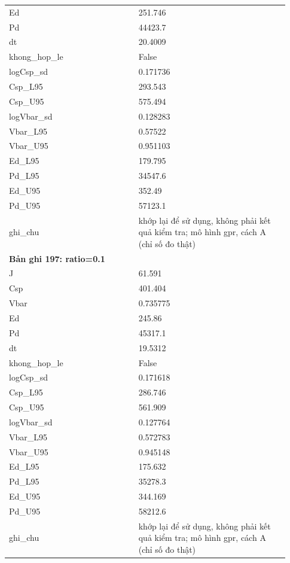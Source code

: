 \begin{longtable}{p{0.43\linewidth}p{0.50\linewidth}}
Ed & 251.746 \\
Pd & 44423.7 \\
dt & 20.4009 \\
khong\_\allowbreak hop\_\allowbreak le & False \\
logCsp\_\allowbreak sd & 0.171736 \\
Csp\_\allowbreak L95 & 293.543 \\
Csp\_\allowbreak U95 & 575.494 \\
logVbar\_\allowbreak sd & 0.128283 \\
Vbar\_\allowbreak L95 & 0.57522 \\
Vbar\_\allowbreak U95 & 0.951103 \\
Ed\_\allowbreak L95 & 179.795 \\
Pd\_\allowbreak L95 & 34547.6 \\
Ed\_\allowbreak U95 & 352.49 \\
Pd\_\allowbreak U95 & 57123.1 \\
ghi\_\allowbreak chu & khớp lại để sử dụng, không phải kết quả kiểm tra; mô hình gpr, cách A (chỉ số đo thật) \\
\midrule
\multicolumn{2}{p{0.95\linewidth}}{\textbf{Bản ghi 197: ratio=0.1}} \\
J & 61.591 \\
Csp & 401.404 \\
Vbar & 0.735775 \\
Ed & 245.86 \\
Pd & 45317.1 \\
dt & 19.5312 \\
khong\_\allowbreak hop\_\allowbreak le & False \\
logCsp\_\allowbreak sd & 0.171618 \\
Csp\_\allowbreak L95 & 286.746 \\
Csp\_\allowbreak U95 & 561.909 \\
logVbar\_\allowbreak sd & 0.127764 \\
Vbar\_\allowbreak L95 & 0.572783 \\
Vbar\_\allowbreak U95 & 0.945148 \\
Ed\_\allowbreak L95 & 175.632 \\
Pd\_\allowbreak L95 & 35278.3 \\
Ed\_\allowbreak U95 & 344.169 \\
Pd\_\allowbreak U95 & 58212.6 \\
ghi\_\allowbreak chu & khớp lại để sử dụng, không phải kết quả kiểm tra; mô hình gpr, cách A (chỉ số đo thật) \\

\end{longtable}
